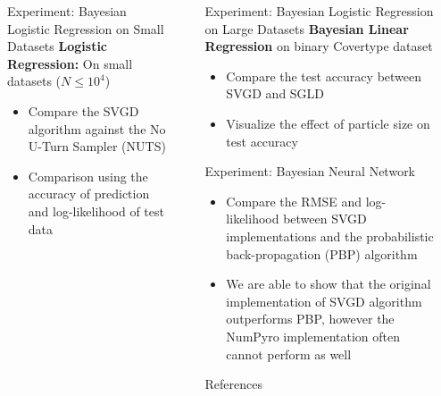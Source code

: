 \documentclass[final]{beamer}
\newlength{\sepwidth}
\newlength{\colwidth}
\newcommand{\separatorcolumn}{\begin{column}{\sepwidth}\end{column}}
\begin{document}
\begin{frame}[t]
\begin{columns}[t]
\begin{column}{\colwidth}
\begin{block}{Experiment: Bayesian Logistic Regression on Small Datasets}
  \textbf{Logistic Regression:} On small datasets ($N \leq 10^4$)
    \begin{itemize}
     \item Compare the SVGD algorithm against the No U-Turn Sampler (NUTS) 
     
     \item Comparison using the accuracy of prediction and log-likelihood of test data
    \end{itemize}
     
  \end{block}

\end{column}

\separatorcolumn

\begin{column}{\colwidth}

  \begin{block}{Experiment: Bayesian Logistic Regression on Large Datasets}
  \textbf{Bayesian Linear Regression} on binary Covertype dataset 
    \begin{itemize}
     \item Compare the test accuracy between SVGD \cite{liu2016stein} and SGLD \cite{welling2011bayesian}
     \item Visualize the effect of particle size on test accuracy
    \end{itemize}
    
  \end{block}
  
  \begin{block}{Experiment: Bayesian Neural Network}
  \begin{itemize}
      \item Compare the RMSE and log-likelihood between SVGD implementations and the probabilistic back-propagation (PBP) algorithm
      
      \item We are able to show that the original implementation of SVGD algorithm outperforms PBP, however the NumPyro implementation often cannot perform as well
  \end{itemize}
  
  \end{block}
  

  \begin{block}{References}

    \nocite{*}
    \footnotesize{}

  \end{block}
  
\end{column}

\separatorcolumn

\end{columns}
\end{frame}
\end{document}
